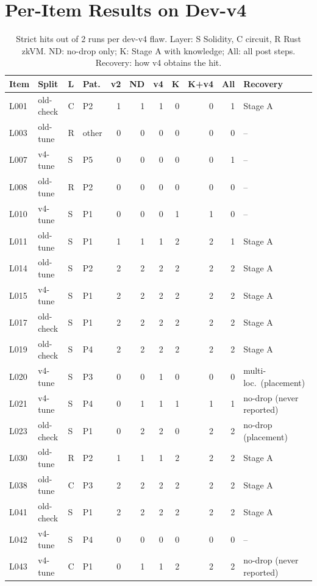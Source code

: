\section{Per-Item Results on Dev-v4}\label{app:items}
\begin{table}[!htb]
\centering\footnotesize
\caption{Strict hits out of 2 runs per dev-v4 flaw. Layer: S Solidity, C
circuit, R Rust zkVM. ND: no-drop only; K: Stage A with knowledge; All: all
post steps. Recovery: how v4 obtains the hit.}
\setlength{\tabcolsep}{2.6pt}
\begin{tabular}{@{}llllrrrrrrl@{}}
\toprule
Item & Split & L & Pat. & v2 & ND & v4 & K & K+v4 & All & Recovery\\
\midrule
L001 & old-check & C & P2 & 1 & 1 & 1 & 0 & 0 & 1 & Stage A \\
L003 & old-tune & R & other & 0 & 0 & 0 & 0 & 0 & 0 & -- \\
L007 & v4-tune & S & P5 & 0 & 0 & 0 & 0 & 0 & 1 & -- \\
L008 & old-tune & R & P2 & 0 & 0 & 0 & 0 & 0 & 0 & -- \\
L010 & v4-tune & S & P1 & 0 & 0 & 0 & 1 & 1 & 0 & -- \\
L011 & old-tune & S & P1 & 1 & 1 & 1 & 2 & 2 & 1 & Stage A \\
L014 & old-tune & S & P2 & 2 & 2 & 2 & 2 & 2 & 2 & Stage A \\
L015 & v4-tune & S & P1 & 2 & 2 & 2 & 2 & 2 & 2 & Stage A \\
L017 & old-check & S & P1 & 2 & 2 & 2 & 2 & 2 & 2 & Stage A \\
L019 & old-check & S & P4 & 2 & 2 & 2 & 2 & 2 & 2 & Stage A \\
L020 & v4-tune & S & P3 & 0 & 0 & 1 & 0 & 0 & 0 & multi-loc.\ (placement) \\
L021 & v4-tune & S & P4 & 0 & 1 & 1 & 1 & 1 & 1 & no-drop (never reported) \\
L023 & old-check & S & P1 & 0 & 2 & 2 & 0 & 2 & 2 & no-drop (placement) \\
L030 & old-tune & R & P2 & 1 & 1 & 1 & 2 & 2 & 2 & Stage A \\
L038 & old-tune & C & P3 & 2 & 2 & 2 & 2 & 2 & 2 & Stage A \\
L041 & old-check & S & P1 & 2 & 2 & 2 & 2 & 2 & 2 & Stage A \\
L042 & v4-tune & S & P4 & 0 & 0 & 0 & 0 & 0 & 0 & -- \\
L043 & v4-tune & C & P1 & 0 & 1 & 1 & 2 & 2 & 2 & no-drop (never reported) \\

\end{tabular}
\end{table}
